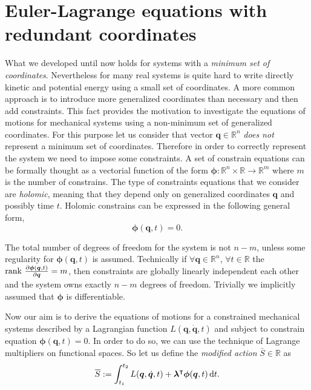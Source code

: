 	\section{Euler-Lagrange equations with redundant coordinates}
		What we developed until now holds for systems with a \emph{minimum set of coordinates}. Nevertheless for many real systems is quite hard to write directly kinetic and potential energy using a small set of coordinates. A more common approach is to introduce more generalized coordinates than necessary and then add constraints. This fact provides the motivation to investigate the equations of motions for mechanical systems using a non-minimum set of generalized coordinates. For this purpose let us consider that vector $\bm{q}\in\mathbb{R}^{n}$ \emph{does not} represent a minimum set of coordinates. Therefore in order to correctly represent the system we need to impose some constraints. A set of constrain equations can be formally thought as a vectorial function of the form $\bm{\phi}:\mathbb{R}^{n}\times\mathbb{R}\rightarrow\mathbb{R}^{m}$ where $m$ is the number of constrains. The type of constraints equations that we consider are \emph{holomic}, meaning that they depend only on generalized coordinates $\bm{q}$ and possibly time $t$. Holomic constrains can be expressed in the following general form,
		\begin{equation}
			\label{eq:constraintsequations}
			\bm{\phi}(\bm{q},t) = 0.
		\end{equation}
		\begin{remark}
			The total number of degrees of freedom for the system is not $n-m$, unless some regularity for $\bm{\phi}(\bm{q},t)$ is assumed. Technically if $\forall\bm{q}\in\mathbb{R}^{n}$, $\forall t\in\mathbb{R}$ the $\mathrm{rank}~\frac{\partial\bm{\phi}(\bm{q},t)}{\partial \bm{q}} = m$, then constraints are globally linearly independent each other and the system owns exactly $n-m$ degrees of freedom. Trivially we implicitly assumed that $\bm{\phi}$ is differentiable.
		\end{remark}
		Now our aim is to derive the equations of motions for a constrained mechanical systems described by a Lagrangian function $L(\bm{q},\dot{\bm{q}},t)$ and subject to constrain equation $\bm{\phi}(\bm{q},t)=0$. In order to do so, we can use the technique of Lagrange multipliers on functional spaces. So let us define the \emph{modified action} $\bar{S}\in\mathbb{R}$ as 
		\begin{equation}
			\label{eq:modifiedaction}
			\overline{S} := \int_{t_{1}}^{t_{2}}L(\bm{q},\dot{\bm{q}},t)+\bm{\lambda}^{\intercal}\bm{\phi}(\bm{q},t)\mathop{}\!\mathrm{d} t. 
		\end{equation}
